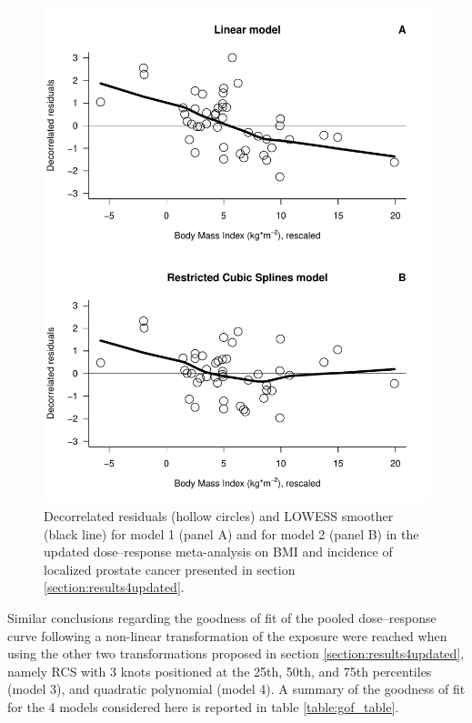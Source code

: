 \begin{figure}[h]
\centering
\includegraphics[width=\linewidth]{figures/gof.pdf}
\caption[Decorrelated-residuals--versus--exposure plots for the dose--response meta-analysis on BMI and localized prostate cancer incidence]{Decorrelated residuals (hollow circles) and LOWESS smoother (black line) for model 1 (panel A) and for model 2 (panel B) in the updated dose--response meta-analysis on BMI and incidence of localized prostate cancer presented in section \ref{section:results4updated}.}
\label{fig:gof_loc}
\end{figure}

Similar conclusions regarding the goodness of fit of the pooled dose--response curve following a non-linear transformation of the exposure were reached when using the other two transformations proposed in section \ref{section:results4updated}, namely RCS with 3 knots positioned at the 25th, 50th, and 75th percentiles (model 3), and quadratic polynomial (model 4). A summary of the goodness of fit for the 4 models considered here is reported in table \ref{table:gof_table}.

